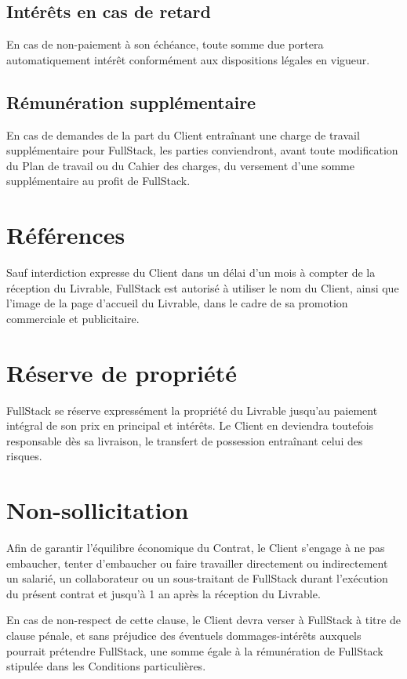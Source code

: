 \documentclass[11pt]{article}
\begin{document}
\subsection{Intérêts en cas de retard}
En cas de non-paiement à son échéance, toute somme due portera automatiquement intérêt conformément aux dispositions légales en vigueur.

\subsection{Rémunération supplémentaire}
En cas de demandes de la part du Client entraînant une charge de travail supplémentaire pour FullStack, les parties conviendront, avant toute modification du Plan de travail ou du Cahier des charges, du versement d’une somme supplémentaire au profit de FullStack.

\section{Références}
Sauf interdiction expresse du Client dans un délai d’un mois à compter de la réception du Livrable, FullStack est autorisé à utiliser le nom du Client, ainsi que l’image de la page d’accueil du Livrable, dans le cadre de sa promotion commerciale et publicitaire.

\section{Réserve de propriété}
FullStack se réserve expressément la propriété du Livrable jusqu’au paiement intégral de son prix en principal et intérêts. Le Client en deviendra toutefois responsable dès sa livraison, le transfert de possession entraînant celui des risques.

\section{Non-sollicitation}
Afin de garantir l’équilibre économique du Contrat, le Client s’engage à ne pas embaucher, tenter d’embaucher ou faire travailler directement ou indirectement un salarié, un collaborateur ou un sous-traitant de FullStack durant l’exécution du présent contrat et jusqu’à 1 an après la réception du Livrable.

En cas de non-respect de cette clause, le Client devra verser à FullStack à titre de clause pénale, et sans préjudice des éventuels dommages-intérêts auxquels pourrait prétendre FullStack, une somme égale à la rémunération de FullStack stipulée dans les Conditions particulières.
\end{document}

